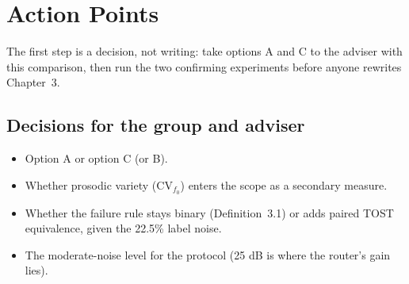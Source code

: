\documentclass[11pt,a4paper]{article}
\begin{document}
\section{Action Points}

The first step is a decision, not writing: take options A and C to the adviser with this comparison, then run the two confirming experiments before anyone rewrites Chapter~3.

\subsection*{Decisions for the group and adviser}
\begin{itemize}[label=$\square$, leftmargin=1.5em]
\item Option A or option C (or B).
\item Whether prosodic variety ($\mathrm{CV}_{f_0}$) enters the scope as a secondary measure.
\item Whether the failure rule stays binary (Definition~3.1) or adds paired TOST equivalence, given the 22.5\% label noise.
\item The moderate-noise level for the protocol (25 dB is where the router's gain lies).
\end{itemize}
\end{document}
